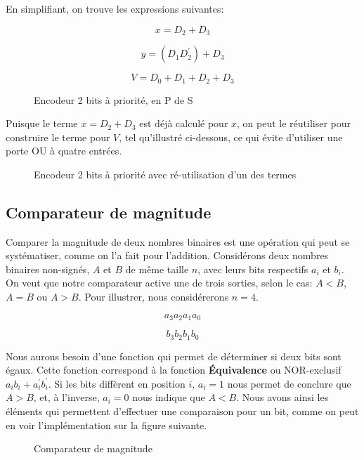 \documentclass[11pt]{article}
\begin{document}
En simplifiant, on trouve les expressions suivantes:

$$ x = D_2 + D_3 $$

$$ y = (D_1 D_2^\prime) + D_3 $$

$$ V = D_0 + D_1 + D_2 + D_3 $$

\begin{figure}[htbp]
\centering

\caption{\label{fig:orgd8098ee}Encodeur 2 bits à priorité, en P de S}
\end{figure}

Puisque le terme \(x = D_2 + D_3\) est déjà calculé pour \(x\), on
peut le réutiliser pour construire le terme pour \(V\), tel
qu'illustré ci-dessous, ce qui évite d'utiliser une porte OU à quatre
entrées.

\begin{figure}[htbp]
\centering

\caption{\label{fig:orgb2cd024}Encodeur 2 bits à priorité avec ré-utilisation d'un des termes}
\end{figure}


\subsection{Comparateur de magnitude}
\label{sec:org5039c0b}

Comparer la magnitude de deux nombres binaires est une opération qui
peut se systématiser, comme on l'a fait pour l'addition. Considérons
deux nombres binaires non-signés, \(A\) et \(B\) de même taille \(n\),
avec leurs bits respectifs \(a_i\) et \(b_i\). On veut que notre
comparateur active une de trois sorties, selon le cas: \(A < B\), \(A
= B\) ou \(A > B\). Pour illustrer, nous considérerons \(n = 4\).

$$ a_3 a_2 a_1 a_0 $$

$$ b_3 b_2 b_1 b_0 $$

Nous aurons besoin d'une fonction qui permet de déterminer si deux
bits sont égaux. Cette fonction correspond à la fonction \textbf{Équivalence}
ou NOR-exclusif \(a_i b_i + a_i^\prime b_i^\prime\).  Si les bits
diffèrent en position \(i\), \(a_i = 1\) nous permet de conclure que
\(A > B\), et, à l'inverse, \(a_i = 0\) nous indique que \(A < B\). Nous avons ainsi
les éléments qui permettent d'effectuer une comparaison pour un bit,
comme on peut en voir l'implémentation sur la figure suivante.

\begin{figure}[htbp]
\centering

\caption{\label{fig:org6b5525a}Comparateur de magnitude}
\end{figure}
\end{document}
